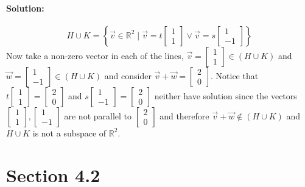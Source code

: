\documentclass[12pt, letterpaper]{article}
\newcommand{\R}{\mathbb{R}}
\theoremstyle{statement}
\theoremstyle{statement}
\newenvironment{Solution}{\noindent\ignorespaces\paragraph{Solution:}}{\hfill \ding{122}\par\noindent}
\begin{document}
\begin{Solution}
    $$
    H \cup K = \left\{ 
    \Vec{v} \in \R^2 
    \mid
    \Vec{v} = t \begin{bmatrix} 
    1 \\ 1
    \end{bmatrix}
    \lor 
    \Vec{v} = s \begin{bmatrix}
    1 \\ -1
    \end{bmatrix}
    \right\}
    $$
    Now take a non-zero vector in each of the lines, $\Vec{v}=\begin{bmatrix} 1 \\ 1\end{bmatrix} \in (H \cup K)$ and $\Vec{w}=\begin{bmatrix} 1\\-1 \end{bmatrix} \in (H \cup K)$ and consider $\Vec{v}+\Vec{w}=\begin{bmatrix} 2 \\ 0\end{bmatrix}$. Notice that $t\begin{bmatrix} 1 \\ 1 \end{bmatrix}=\begin{bmatrix} 2\\0\end{bmatrix}$ and $s\begin{bmatrix} 1\\-1\end{bmatrix}=\begin{bmatrix}2\\0\end{bmatrix}$ neither have solution since the vectors $\begin{bmatrix} 1\\1\end{bmatrix}, \begin{bmatrix} 1\\-1 \end{bmatrix}$ are not parallel to $\begin{bmatrix} 2\\0\end{bmatrix}$ and therefore $\Vec{v}+\Vec{w} \notin (H \cup K)$ and $H \cup K$ is not a subspace of $\R^2$.
    
    
    \end{Solution}
    
    \section*{Section 4.2}
\end{document}
